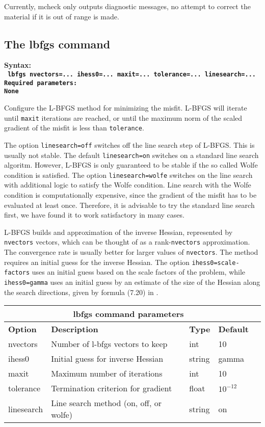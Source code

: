 \documentclass[12pt]{report}
\begin{document}
Currently, mcheck only outputs diagnostic messages, no attempt to correct the material if
it is out of range is made.

\subsection{The lbfgs command}\label{sec:lbfgs}
\begin{flushleft}\bf
Syntax:\\
\tt
lbfgs nvectors=... ihess0=... maxit=... tolerance=... linesearch=...
\\
\bf Required parameters:\\
\rm
None
\end{flushleft}
Configure the L-BFGS method for minimizing the misfit. L-BFGS will iterate until \verb+maxit+ iterations
are reached, or until the maximum norm of the scaled gradient of the misfit is less than \verb+tolerance+. 
\par
The option {\tt linesearch=off} switches off the line search step of L-BFGS. This is usually not stable.
The default {\tt linesearch=on} switches on a standard line search algoritm. However, L-BFGS is only guaranteed to
be stable if the so called Wolfe condition is satisfied. The option {\tt linesearch=wolfe} switches on
the line search with additional logic to satisfy the Wolfe condition. Line search with the Wolfe condition 
is computationally expensive, since the gradient of the misfit has to be evaluated at least once. Therefore,
it is advisable to try the standard line search first, we have found it to work satisfactory in many cases.
\par
L-BFGS builds and approximation of the inverse Hessian, represented by \verb+nvectors+ vectors, which can
be thought of as a rank-\verb+nvectors+ approximation. The convergence rate is usually better for larger 
values of \verb+nvectors+. The method requires an initial guess for the inverse Hessian. The option
{\tt ihess0=scale-factors} uses an initial guess based on the scale factors of the problem, while
{\tt ihess0=gamma} uses an initial guess by an estimate of the size of the Hessian along the search 
directions, given by formula (7.20) in \cite{Nocedal-Wright}.

\begin{center}
\begin{tabular}{|l|p{7cm}|l|l|l|} \hline
\multicolumn{4}{|c|}{\bf lbfgs command parameters}\\ \hline
{\bf Option} & {\bf Description}          & {\bf Type} & {\bf Default} \\ \hline 
\hline
nvectors   & Number of l-bfgs vectors to keep & int   & 10 \\ \hline
ihess0     & Initial guess for inverse Hessian & string & gamma \\ \hline
maxit      & Maximum number of iterations  & int & 10 \\ \hline
tolerance  & Termination criterion for gradient  & float & $10^{-12}$ \\ \hline
linesearch  & Line search method (on, off, or wolfe)  & string & on \\ \hline
\end{tabular}
\end{center}
\end{document}
